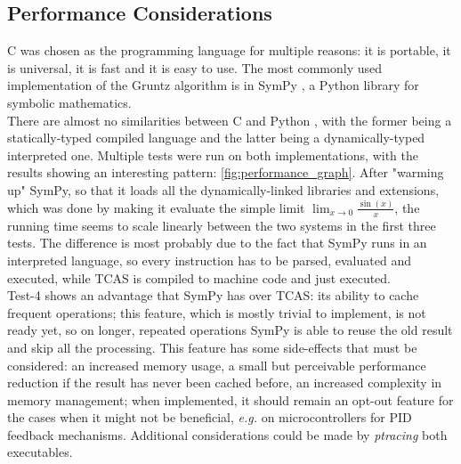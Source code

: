 \documentclass{article}
\theoremstyle{plain}
\theoremstyle{definition}
\theoremstyle{algorithm}
\begin{document}
	
	\subsection{Performance Considerations}
	
	C was chosen as the programming language for multiple reasons: it is portable, it is universal, it is fast and it is easy to use.
	The most commonly used implementation of the Gruntz algorithm is in SymPy \cite{10.7717/peerj-cs.103}, a Python library for symbolic mathematics. \\
	There are almost no similarities between C and Python \cite{book:python}, with the former being a statically-typed \cite{wiki:typesystem} compiled language and the latter being a dynamically-typed \cite{wiki:typesystem} interpreted one. 
	Multiple tests were run on both implementations, with the results showing an interesting pattern: \cref{fig:performance_graph}. After "warming up" SymPy, so that it loads all the dynamically-linked libraries and extensions, which was done by making it evaluate the simple limit \(\lim_{x \to 0}{\frac{\sin(x)}{x}}\), the running time seems to scale linearly between the two systems in the first three tests. The difference is most probably due to the fact that SymPy runs in an interpreted language, so every instruction has to be parsed, evaluated and executed, while TCAS is compiled to machine code and just executed. \\
	Test-4 shows an advantage that SymPy has over TCAS: its ability to cache frequent operations; this feature, which is mostly trivial to implement, is not ready yet, so on longer, repeated operations SymPy is able to reuse the old result and skip all the processing. This feature has some side-effects that must be considered: an increased memory usage, a small but perceivable performance reduction if the result has never been cached before, an increased complexity in memory management; when implemented, it should remain an opt-out feature for the cases when it might not be beneficial, \textit{e.g.} on microcontrollers for PID \cite{wiki:pid} feedback mechanisms.
	Additional considerations could be made by \textit{ptracing} \cite{wiki:ptrace} both executables.
	
\end{document}
